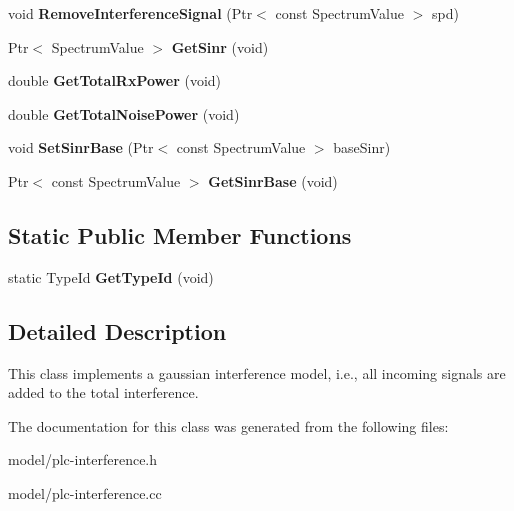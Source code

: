 \begin{DoxyCompactItemize}
\item 
\hypertarget{classns3_1_1PLC__Interference_ae89a2841054afd0218648e992563de33}{void {\bfseries \-Remove\-Interference\-Signal} (\-Ptr$<$ const \-Spectrum\-Value $>$ spd)}\label{classns3_1_1PLC__Interference_ae89a2841054afd0218648e992563de33}

\item 
\hypertarget{classns3_1_1PLC__Interference_a117208311aa8155ed5d10ea9f2992599}{\-Ptr$<$ \-Spectrum\-Value $>$ {\bfseries \-Get\-Sinr} (void)}\label{classns3_1_1PLC__Interference_a117208311aa8155ed5d10ea9f2992599}

\item 
\hypertarget{classns3_1_1PLC__Interference_a627b2aceb9946da400a23adc5b0d57c6}{double {\bfseries \-Get\-Total\-Rx\-Power} (void)}\label{classns3_1_1PLC__Interference_a627b2aceb9946da400a23adc5b0d57c6}

\item 
\hypertarget{classns3_1_1PLC__Interference_a5788ba21418643ec78b782f28748a0d9}{double {\bfseries \-Get\-Total\-Noise\-Power} (void)}\label{classns3_1_1PLC__Interference_a5788ba21418643ec78b782f28748a0d9}

\item 
\hypertarget{classns3_1_1PLC__Interference_a3b97ef0d79bbb2c606ae9d0fa1b3bd1d}{void {\bfseries \-Set\-Sinr\-Base} (\-Ptr$<$ const \-Spectrum\-Value $>$ base\-Sinr)}\label{classns3_1_1PLC__Interference_a3b97ef0d79bbb2c606ae9d0fa1b3bd1d}

\item 
\hypertarget{classns3_1_1PLC__Interference_a38dae27ca47069f73b9db6223310d9b2}{\-Ptr$<$ const \-Spectrum\-Value $>$ {\bfseries \-Get\-Sinr\-Base} (void)}\label{classns3_1_1PLC__Interference_a38dae27ca47069f73b9db6223310d9b2}

\end{DoxyCompactItemize}
\subsection*{\-Static \-Public \-Member \-Functions}
\begin{DoxyCompactItemize}
\item 
\hypertarget{classns3_1_1PLC__Interference_ad0047c99648c847679d9a583979ddc10}{static \-Type\-Id {\bfseries \-Get\-Type\-Id} (void)}\label{classns3_1_1PLC__Interference_ad0047c99648c847679d9a583979ddc10}

\end{DoxyCompactItemize}


\subsection{\-Detailed \-Description}
\-This class implements a gaussian interference model, i.\-e., all incoming signals are added to the total interference. 

\-The documentation for this class was generated from the following files\-:\begin{DoxyCompactItemize}
\item 
model/plc-\/interference.\-h\item 
model/plc-\/interference.\-cc\end{DoxyCompactItemize}

